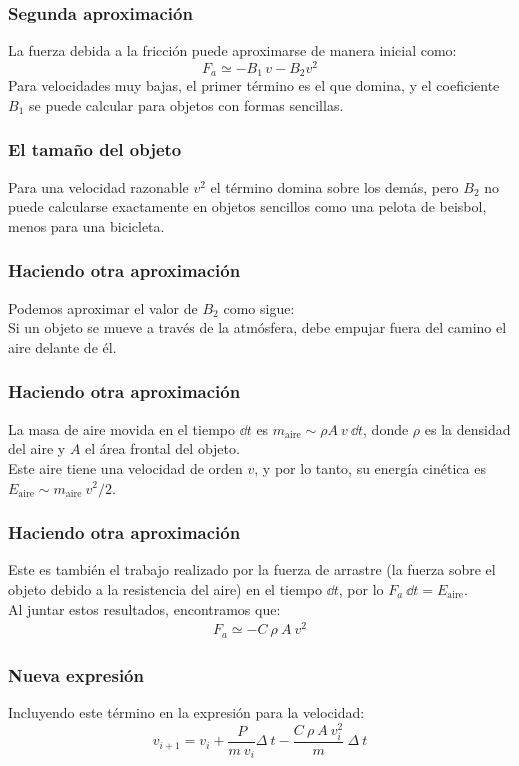 \documentclass[12pt]{beamer}
\begin{document}
\begin{frame}
\frametitle{Segunda aproximación}
La fuerza debida a la fricción puede aproximarse de manera inicial como:
\pause
\begin{equation}
F_{a} \simeq - B_{1} \, v - B_{2} v^{2}
\label{EqFfriccion}
\end{equation}
Para velocidades muy bajas, el primer término es el que domina, y el coeficiente $B_{1}$ se puede calcular para objetos con formas sencillas.
\end{frame}
\begin{frame}
\frametitle{El tamaño del  objeto}
Para una velocidad razonable $v^{2}$ el término domina sobre los demás, pero $B_{2}$ no puede calcularse exactamente en objetos sencillos como una pelota de beisbol, menos para una bicicleta.
\end{frame}
\begin{frame}
\frametitle{Haciendo otra aproximación}
Podemos aproximar el valor de $B_{2}$ como sigue:
\\
\bigskip
\pause
Si un objeto se mueve a través de la atmósfera, debe empujar fuera del camino el aire delante de él. 
\end{frame}
\begin{frame}
\frametitle{Haciendo otra aproximación}
La masa de aire movida en el tiempo $\dd{t}$ es $m_{\text{aire}} \sim \rho A \: v \: \dd{t}$, donde $\rho$ 
es la densidad del aire y $A$ el área frontal del objeto.
\\
\bigskip
\pause
Este aire tiene una velocidad de orden $v$, y por lo tanto, su energía cinética es $E_{\text{aire}} \sim m_{\text{aire}} \: v^{2} / 2$.
\end{frame}
\begin{frame}
\frametitle{Haciendo otra aproximación}
Este es también el trabajo realizado por la fuerza de arrastre (la fuerza sobre el objeto debido a la resistencia del aire) en el tiempo $\dd{t}$, por lo $F_{a} \: \dd{t} = E_{\text{aire}}$.
\\
\bigskip
\pause
Al juntar estos resultados, encontramos que:
\pause
\begin{align*}
F_{a} \simeq - C \: \rho \: A \: v^{2}
\end{align*}
\end{frame}
\begin{frame}
\frametitle{Nueva expresión}
Incluyendo este término en la expresión para la velocidad:
\pause
\begin{equation}
v_{i+1} = v_{i} + \dfrac{P}{m \: v_{i}} \Delta \: t - \dfrac{C \: \rho \: A \: v_{i}^{2}}{m} \: \Delta \: t
\label{Eqvelifriccion}
\end{equation}
\end{frame}
\end{document}
